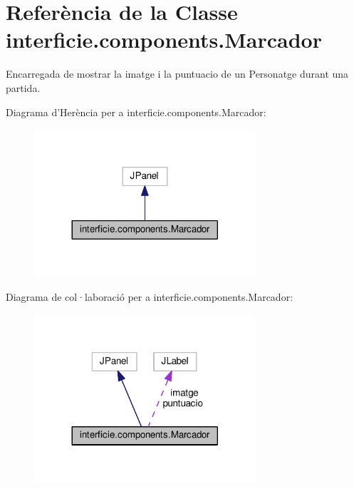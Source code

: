 \hypertarget{classinterficie_1_1components_1_1_marcador}{\section{Referència de la Classe interficie.\+components.\+Marcador}
\label{classinterficie_1_1components_1_1_marcador}
}


Encarregada de mostrar la imatge i la puntuacio de un Personatge durant una partida.  




Diagrama d'Herència per a interficie.\+components.\+Marcador\+:\nopagebreak
\begin{figure}[H]
\begin{center}
\leavevmode
\includegraphics[width=233pt]{classinterficie_1_1components_1_1_marcador__inherit__graph}
\end{center}
\end{figure}


Diagrama de col·laboració per a interficie.\+components.\+Marcador\+:\nopagebreak
\begin{figure}[H]
\begin{center}
\leavevmode
\includegraphics[width=233pt]{classinterficie_1_1components_1_1_marcador__coll__graph}
\end{center}
\end{figure}
